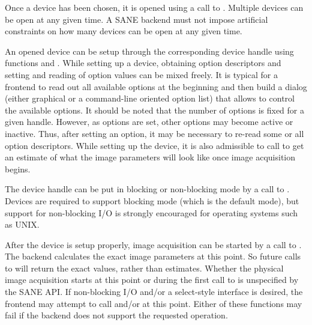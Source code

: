 \documentclass[11pt,DVIps]{report}
\begin{document}
Once a device has been chosen, it is opened using a call to
.  Multiple devices can be open at any given time.
A SANE backend must not impose artificial constraints on how many
devices can be open at any given time.

An opened device can be setup through the corresponding device handle
using functions  and
.  While setting up a device, obtaining
option descriptors and setting and reading of option values can be
mixed freely.  It is typical for a frontend to read out all available
options at the beginning and then build a dialog (either graphical or
a command-line oriented option list) that allows to control the
available options.  It should be noted that the number of options is
fixed for a given handle.  However, as options are set, other options
may become active or inactive.  Thus, after setting an option, it
may be necessary to re-read some or all option descriptors.  While
setting up the device, it is also admissible to call
 to get an estimate of what the image
parameters will look like once image acquisition begins.

The device handle can be put in blocking or non-blocking mode by a
call to .  Devices are required to support
blocking mode (which is the default mode), but support for
non-blocking I/O is strongly encouraged for operating systems such as
UNIX.

After the device is setup properly, image acquisition can be started
by a call to .  The backend calculates the exact
image parameters at this point.  So future calls to
 will return the exact values, rather
than estimates.  Whether the physical image acquisition starts at this
point or during the first call to  is unspecified
by the SANE API.  If non-blocking I/O and/or a select-style interface
is desired, the frontend may attempt to call
 and/or  at
this point.  Either of these functions may fail if the backend does
not support the requested operation.
\end{document}
